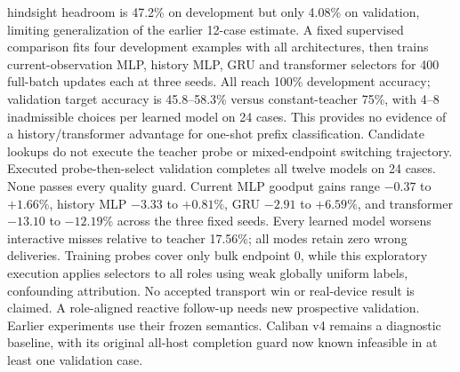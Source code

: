 \documentclass[11pt]{article}
\begin{document}
hindsight headroom is 47.2\% on development but only 4.08\% on validation,
limiting generalization of the earlier 12-case estimate. A fixed supervised
comparison fits four development examples with all architectures, then trains
current-observation MLP, history MLP, GRU and transformer selectors for 400
full-batch updates each at three seeds. All reach 100\% development accuracy;
validation target accuracy is 45.8--58.3\% versus constant-teacher 75\%, with
4--8 inadmissible choices per learned model on 24 cases. This provides no evidence
of a history/transformer advantage for one-shot prefix classification. Candidate
lookups do not execute the teacher probe or mixed-endpoint switching trajectory.
Executed probe-then-select validation completes all twelve models on 24 cases.
None passes every quality guard. Current MLP goodput gains range $-0.37$ to
$+1.66\%$, history MLP $-3.33$ to $+0.81\%$, GRU $-2.91$ to $+6.59\%$, and
transformer $-13.10$ to $-12.19\%$ across the three fixed seeds. Every learned
model worsens interactive misses relative to teacher 17.56\%; all modes retain
zero wrong deliveries. Training probes cover only bulk endpoint 0, while this
exploratory execution applies selectors to all roles using weak globally uniform
labels, confounding attribution. No accepted transport win or real-device result
is claimed. A role-aligned reactive follow-up needs new prospective validation.
Earlier experiments use their frozen semantics. Caliban v4 remains a diagnostic baseline, with its original all-host
completion guard now known infeasible in at least one validation case.
\end{document}
